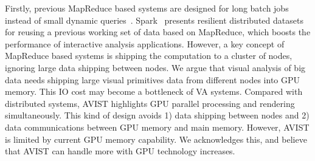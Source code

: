 Firstly, previous MapReduce based systems are designed for long batch jobs instead of small dynamic queries~\cite{Dean:2008}. Spark~\cite{Zaharia:2010} presents resilient distributed datasets  for reusing a previous working set  of data based on MapReduce, which boosts the performance of interactive analysis applications. However, a key concept of MapReduce based systems is shipping the computation to a cluster of nodes, ignoring large data shipping between nodes.  We argue that visual analysis of big data needs shipping large visual primitives data from different nodes into GPU memory. This IO cost may become a bottleneck of VA systems. Compared with distributed systems, AVIST highlights GPU parallel processing and rendering simultaneously. This kind of design avoids 1) data shipping between nodes and 2) data communications between GPU memory and main memory.  However, AVIST is limited by current GPU memory capability. We acknowledges this, and believe that AVIST can handle more with GPU technology increases. 



